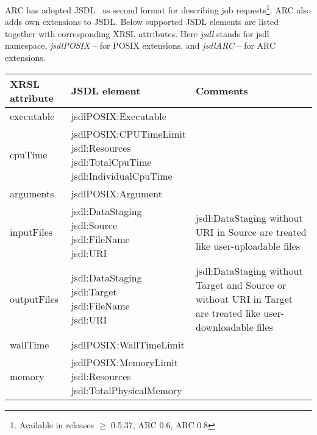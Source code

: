   	
  ARC has adopted JSDL~\cite{jsdl} as second format for describing job
  requests\footnote{Available in releases $\geq$ 0.5.37, ARC 0.6, ARC 0.8}. ARC also adds own extensions to JSDL. Below supported JSDL 
  elements are listed together with corresponding XRSL
  attributes. Here \textit{jsdl} stands for jsdl namespace,
  \textit{jsdlPOSIX} -- for POSIX extensions, and \textit{jsdlARC} --
  for ARC extensions.

\begin{longtable}{|l|l|p{5cm}|}
\hline 
\textbf{XRSL attribute} & \textbf{JSDL element} & \textbf{Comments} \\ \hline 
executable & jsdlPOSIX:Executable & \\ \hline 
cpuTime & \parbox[t]{5.5cm}{
    jsdlPOSIX:CPUTimeLimit \\
    jsdl:Resources \\
    \hspace*{0.5cm}jsdl:TotalCpuTime\\
    \hspace*{0.5cm}jsdl:IndividualCpuTime} & \\ \hline 
arguments & jsdlPOSIX:Argument & \\ \hline 
inputFiles &  \parbox[t]{5.5cm}{
    jsdl:DataStaging \\
    \hspace*{0.5cm}jsdl:Source \\
    \hspace*{1cm}jsdl:FileName \\
    \hspace*{1cm}jsdl:URI} &
    jsdl:DataStaging without URI in Source are treated like user-uploadable files \\ \hline
outputFiles & \parbox[t]{5.5cm}{
    jsdl:DataStaging \\
    \hspace*{0.5cm}jsdl:Target \\
    \hspace*{1cm}jsdl:FileName \\
    \hspace*{1cm}jsdl:URI} &
    jsdl:DataStaging without Target and Source or without URI in Target are treated like user-downloadable files \\ \hline 
wallTime & jsdlPOSIX:WallTimeLimit & \\ \hline 
memory &  \parbox[t]{5.5cm}{
    jsdlPOSIX:MemoryLimit \\
    jsdl:Resources \\
    \hspace*{0.5cm}jsdl:TotalPhysicalMemory \\
}
\end{longtable}
